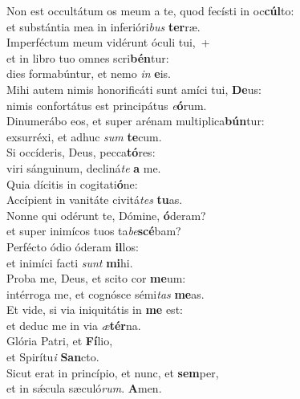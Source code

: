 \evenverse Non est occultátum os meum a te, quod fecísti in oc\textbf{cúl}to:~\*\\
\evenverse et substántia mea in inferióri\textit{bus} \textbf{ter}ræ.\\
\oddverse Imperféctum meum vidérunt óculi tui,~+\\
\oddverse  et in libro tuo omnes scri\textbf{bén}tur:~\*\\
\oddverse dies formabúntur, et nemo \textit{in} \textbf{e}is.\\
\evenverse Mihi autem nimis honorificáti sunt amíci tui, \textbf{De}us:~\*\\
\evenverse nimis confortátus est principátus \textit{e}\textbf{ó}rum.\\
\oddverse Dinumerábo eos, et super arénam multiplica\textbf{bún}tur:~\*\\
\oddverse exsurréxi, et adhuc \textit{sum} \textbf{te}cum.\\
\evenverse Si occíderis, Deus, pecca\textbf{tó}res:~\*\\
\evenverse viri sánguinum, decliná\textit{te} \textbf{a} me.\\
\oddverse Quia dícitis in cogitati\textbf{ó}ne:~\*\\
\oddverse Accípient in vanitáte civitá\textit{tes} \textbf{tu}as.\\
\evenverse Nonne qui odérunt te, Dómine, \textbf{ó}deram?~\*\\
\evenverse et super inimícos tuos ta\textit{be}\textbf{scé}bam?\\
\oddverse Perfécto ódio óderam \textbf{il}los:~\*\\
\oddverse et inimíci facti \textit{sunt} \textbf{mi}hi.\\
\evenverse Proba me, Deus, et scito cor \textbf{me}um:~\*\\
\evenverse intérroga me, et cognósce sémi\textit{tas} \textbf{me}as.\\
\oddverse Et vide, si via iniquitátis in \textbf{me} est:~\*\\
\oddverse et deduc me in via \textit{æ}\textbf{tér}na.\\
\evenverse Glória Patri, et \textbf{Fí}lio,~\*\\
\evenverse et Spirítu\textit{i} \textbf{San}cto.\\
\oddverse Sicut erat in princípio, et nunc, et \textbf{sem}per,~\*\\
\oddverse et in sǽcula sæculó\textit{rum}. \textbf{A}men.\\
